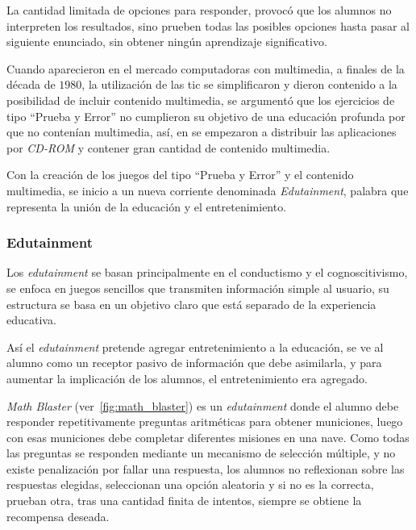 La cantidad limitada de opciones para responder, provocó que los alumnos no
interpreten los resultados, sino prueben todas las posibles opciones hasta
pasar al siguiente enunciado, sin obtener ningún aprendizaje
significativo\cite{leinonen:ict}.

Cuando aparecieron en el mercado computadoras con multimedia, a finales de la
década de $1980$, la utilización de las \Gls{tic} se simplificaron y dieron
contenido a la posibilidad de incluir contenido multimedia, se argumentó que los
ejercicios de tipo \enquote{Prueba y Error} no cumplieron su objetivo de una
educación profunda por que no contenían multimedia\cite{leinonen:ict}, así, en
se empezaron a distribuir las aplicaciones por \textit{CD-ROM} y contener gran
cantidad de contenido multimedia.

Con la creación de los juegos del tipo \enquote{Prueba y Error} y el contenido
multimedia, se inicio a un nueva corriente denominada \emph{Edutainment},
palabra que representa la unión de la educación y el entretenimiento. 

\subsubsection{Edutainment}
\label{sec:edutainment}

Los \emph{edutainment} se basan principalmente en el conductismo y el
cognoscitivismo, se enfoca en juegos sencillos que transmiten información simple
al usuario, su estructura se basa en un objetivo claro que está separado de la
experiencia educativa\cite{egenfeldt2007third}. 

Así el \emph{edutainment} pretende agregar entretenimiento a la educación, se
ve al alumno como un receptor pasivo de información que debe asimilarla, y para
aumentar la implicación de los alumnos, el entretenimiento era
agregado\cite{resnick:2004}.

\emph{Math Blaster} (ver~\ref{fig:math_blaster}) es un \emph{edutainment} donde
el alumno debe responder repetitivamente preguntas aritméticas para obtener
municiones, luego con esas municiones debe completar diferentes misiones en una
nave\cite{bruckman1999can}. Como todas las preguntas se responden mediante un
mecanismo de selección múltiple, y no existe penalización por fallar una
respuesta, los alumnos no reflexionan sobre las respuestas elegidas, seleccionan
una opción aleatoria y si no es la correcta, prueban otra, tras una cantidad
finita de intentos, siempre se obtiene la recompensa deseada.

